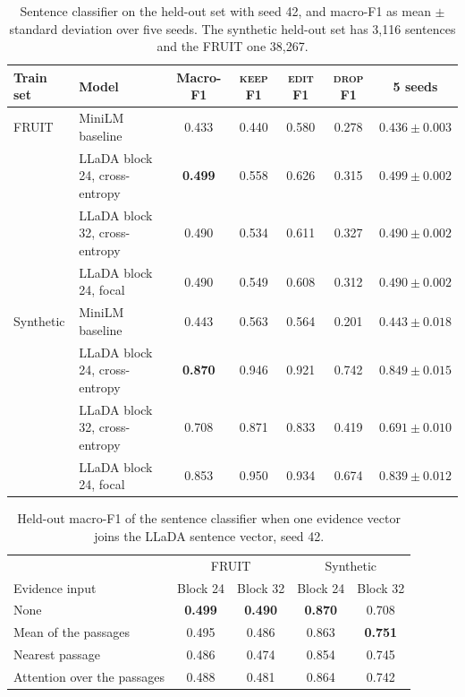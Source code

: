 \documentclass[]{paper}
\newcommand{\keep}{\textsc{keep}}
\newcommand{\edit}{\textsc{edit}}
\newcommand{\drop}{\textsc{drop}}
\begin{document}
\begin{table}[H]
\caption{Sentence classifier on the held-out set with seed 42, and macro-F1 as mean $\pm$ standard deviation over five seeds. The synthetic held-out set has 3,116 sentences and the FRUIT one 38,267.}
\label{tab:classifier_full}
\centering
\footnotesize
\setlength{\tabcolsep}{4pt}
\begin{tabular}{llccccc}
\toprule
Train set & Model & Macro-F1 & \keep{} F1 & \edit{} F1 & \drop{} F1 & 5 seeds \\
\midrule
FRUIT & MiniLM baseline & 0.433 & 0.440 & 0.580 & 0.278 & $0.436 \pm 0.003$ \\
 & LLaDA block 24, cross-entropy & \textbf{0.499} & 0.558 & 0.626 & 0.315 & $0.499 \pm 0.002$ \\
 & LLaDA block 32, cross-entropy & 0.490 & 0.534 & 0.611 & 0.327 & $0.490 \pm 0.002$ \\
 & LLaDA block 24, focal & 0.490 & 0.549 & 0.608 & 0.312 & $0.490 \pm 0.002$ \\
\midrule
Synthetic & MiniLM baseline & 0.443 & 0.563 & 0.564 & 0.201 & $0.443 \pm 0.018$ \\
 & LLaDA block 24, cross-entropy & \textbf{0.870} & 0.946 & 0.921 & 0.742 & $0.849 \pm 0.015$ \\
 & LLaDA block 32, cross-entropy & 0.708 & 0.871 & 0.833 & 0.419 & $0.691 \pm 0.010$ \\
 & LLaDA block 24, focal & 0.853 & 0.950 & 0.934 & 0.674 & $0.839 \pm 0.012$ \\
\bottomrule
\end{tabular}
\end{table}

\begin{table}[H]
\caption{Held-out macro-F1 of the sentence classifier when one evidence vector joins the LLaDA sentence vector, seed 42.}
\label{tab:evidence}
\centering
\footnotesize
\begin{tabular}{lcccc}
\toprule
 & \multicolumn{2}{c}{FRUIT} & \multicolumn{2}{c}{Synthetic} \\
Evidence input & Block 24 & Block 32 & Block 24 & Block 32 \\
\midrule
None & \textbf{0.499} & \textbf{0.490} & \textbf{0.870} & 0.708 \\
Mean of the passages & 0.495 & 0.486 & 0.863 & \textbf{0.751} \\
Nearest passage & 0.486 & 0.474 & 0.854 & 0.745 \\
Attention over the passages & 0.488 & 0.481 & 0.864 & 0.742 \\
\bottomrule
\end{tabular}
\end{table}
\end{document}
